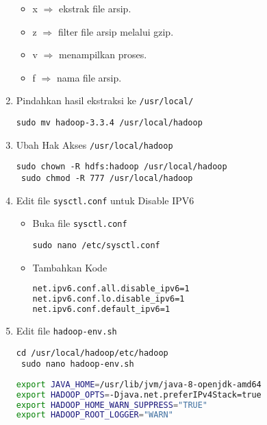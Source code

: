 \documentclass[a4paper]{tufte-handout}
\begin{document}
\begin{enumerate}
\begin{itemize}
\item x $\Rightarrow$ ekstrak file arsip.
\item z $\Rightarrow$ filter file arsip melalui gzip.
\item v $\Rightarrow$ menampilkan proses.
\item f $\Rightarrow$ nama file arsip.
\end{itemize}

\item Pindahkan hasil ekstraksi ke {\tt /usr/local/}
\begin{lstlisting}[language=Terminal]
 sudo mv hadoop-3.3.4 /usr/local/hadoop
\end{lstlisting}

\item Ubah Hak Akses {\tt /usr/local/hadoop}
\begin{lstlisting}[language=Terminal]
 sudo chown -R hdfs:hadoop /usr/local/hadoop
 sudo chmod -R 777 /usr/local/hadoop
\end{lstlisting}

\item Edit file {\tt sysctl.conf} untuk Disable IPV6
\begin{itemize}
\item Buka file {\tt sysctl.conf}
\begin{lstlisting}[language=Terminal]
 sudo nano /etc/sysctl.conf
\end{lstlisting}

\item Tambahkan Kode
\begin{lstlisting}[language=Bash]
net.ipv6.conf.all.disable_ipv6=1
net.ipv6.conf.lo.disable_ipv6=1
net.ipv6.conf.default_ipv6=1
\end{lstlisting}
\end{itemize}

\item Edit file {\tt hadoop-env.sh}
\begin{lstlisting}[language=Terminal]
 cd /usr/local/hadoop/etc/hadoop
 sudo nano hadoop-env.sh
\end{lstlisting}

\begin{lstlisting}[language=Bash]
export JAVA_HOME=/usr/lib/jvm/java-8-openjdk-amd64
export HADOOP_OPTS=-Djava.net.preferIPv4Stack=true
export HADOOP_HOME_WARN_SUPPRESS="TRUE"
export HADOOP_ROOT_LOGGER="WARN"
\end{lstlisting}


\end{enumerate}
\end{document}
